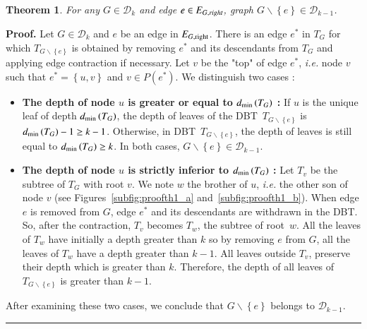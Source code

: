 \documentclass[preprint]{elsarticle}
\newtheorem{theorem}{Theorem}
\newenvironment{proof}[1][Proof]{\textbf{#1.} }{\ \rule{0.5em}{0.5em}}
\newcommand{\set}[1]{\left\{ #1 \right\}}
\newcommand{\mcald}{\mathcal{D}}
\newcommand{\ebt}{DBT}
\newcommand{\dmin}{d_{\mbox{\scriptsize{min}}}}
\newcommand{\eright}[1]{E_{#1, \mbox{\scriptsize{right}}}}
\begin{document}
\begin{theorem}
For any $G \in \mcald_k$ and edge $e \in E_{G, \emph{right}}$, graph $G \backslash \set{e} \in \mcald_{k-1}$.
\label{th:completebinary}
\end{theorem}
\begin{proof}
Let $G \in \mcald_k$ and $e$ be an edge in $\eright{G}$. There is an edge $e^*$ in $T_G$ for which $T_{G \backslash \set{e}}$ is obtained by removing $e^*$ and its descendants from $T_G$ and applying edge contraction if necessary. Let $v$ be the "top" of edge $e^*$, {\em i.e.} node $v$ such that $e^* = \set{u, v}$ and $v \in P(e^*)$. We distinguish two cases :
\begin{itemize}[leftmargin=0.3cm]
\item {\bf The depth of node $u$ is greater or equal to $\dmin\left(T_G\right)$ :} If $u$ is the unique leaf of depth $\dmin\left(T_G\right)$, the depth of leaves of the \ebt ~$T_{G\backslash \set{e}}$ is $\dmin\left(T_G\right) - 1 \geq k-1$. Otherwise, in \ebt ~$T_{G\backslash \set{e}}$, the depth of leaves is still equal to $\dmin\left(T_G\right) \geq k$. In both cases, $G\backslash \set{e} \in \mcald_{k-1}$.
\item {\bf The depth of node $u$ is strictly inferior to $\dmin\left(T_G\right)$ :} Let $T_v$ be the subtree of $T_G$ with root $v$. We note $w$ the brother of $u$, {\em i.e.} the other son of node $v$ (see Figures~\ref{subfig:proofth1_a} and~\ref{subfig:proofth1_b}). 
When edge $e$ is removed from $G$, edge $e^*$ and its descendants are withdrawn in the \ebt . So, after the contraction, $T_v$ becomes $T_w$, the subtree of root~$w$. All the leaves of $T_w$ have initially a depth greater than $k$ so by removing $e$ from $G$, all the leaves of $T_w$ have a depth greater than $k-1$. All leaves outside $T_v$, preserve their depth which is greater than $k$. Therefore, the depth of all leaves of $T_{G \backslash \set{e}}$ is greater than $k-1$.
\end{itemize}
After examining these two cases, we conclude that $G\backslash \set{e}$ belongs to  
$\mcald_{k-1}$.
\end{proof}
\end{document}
